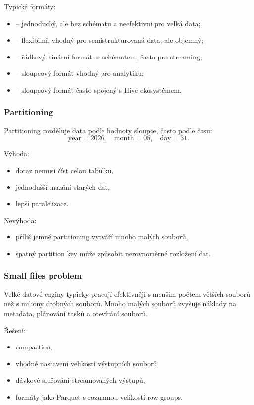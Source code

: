 Typické formáty:
\begin{itemize}
    \item {} -- jednoduchý, ale bez schématu a neefektivní pro velká data;
    \item {} -- flexibilní, vhodný pro semistrukturovaná data, ale objemný;
    \item {} -- řádkový binární formát se schématem, často pro streaming;
    \item {} -- sloupcový formát vhodný pro analytiku;
    \item {} -- sloupcový formát často spojený s Hive ekosystémem.
\end{itemize}

\subsubsection{Partitioning}

Partitioning rozděluje data podle hodnoty sloupce, často podle času:
\[
\text{year}=2026,\quad
\text{month}=05,\quad
\text{day}=31.
\]

Výhoda:
\begin{itemize}
    \item dotaz nemusí číst celou tabulku,
    \item jednodušší mazání starých dat,
    \item lepší paralelizace.
\end{itemize}

Nevýhoda:
\begin{itemize}
    \item příliš jemné partitioning vytváří mnoho malých souborů,
    \item špatný partition key může způsobit nerovnoměrné rozložení dat.
\end{itemize}

\subsubsection{Small files problem}

Velké datové enginy typicky pracují efektivněji s menším počtem větších souborů než s miliony drobných
souborů. Mnoho malých souborů zvyšuje náklady na metadata, plánování tasků a otevírání souborů.

Řešení:
\begin{itemize}
    \item compaction,
    \item vhodné nastavení velikosti výstupních souborů,
    \item dávkové slučování streamovaných výstupů,
    \item formáty jako Parquet s rozumnou velikostí row groups.
\end{itemize}

